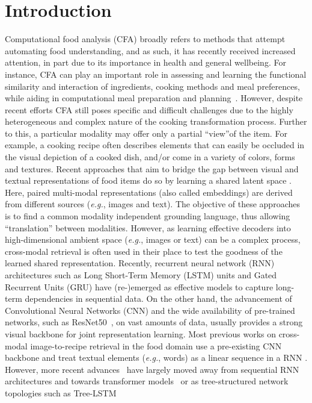 \documentclass[sigconf,nonacm]{acmart}
\def\eg{\emph{e.g.}} \def\Eg{\emph{E.g.}}
\begin{document}
\maketitle


\section{Introduction}
Computational food analysis (CFA) broadly refers to methods that attempt automating food understanding, and as such, it has recently received increased attention, in part due to its importance in health and general wellbeing. For instance, CFA  can play an important role in assessing and learning the functional similarity and interaction of ingredients, cooking methods and meal preferences, while aiding in computational meal preparation and planning~\cite{teng2012recipe,helmy2015health}. However, despite recent efforts CFA still poses specific and difficult challenges due to the highly heterogeneous and complex nature of the cooking transformation process. Further to this, a particular modality may offer only a partial ``view''of the item. For example, a cooking recipe often describes elements that can easily be occluded in the visual depiction of a cooked dish, and/or come in a variety of colors, forms and textures. Recent approaches that aim to bridge the gap between visual and textual representations of food items do so by learning a shared latent space \cite{salvador2017,chen2018,carvalho2018,wang2019,marin2019,Fu2020,Fain2019,Zhu2019,salvador2021,wang2020}. Here, paired multi-modal representations (also called embeddings) are derived from different sources (\eg, images and text). The objective of these approaches is to find a common modality independent grounding language, thus allowing ``translation'' between modalities. However, as learning effective decoders into high-dimensional ambient space (\eg, images or text) can be a complex process, cross-modal retrieval is often used in their place to test the goodness of the learned shared representation. Recently, recurrent neural network (RNN) architectures such as Long Short-Term Memory (LSTM) \cite{hochreiter1997} units and Gated Recurrent Units (GRU) \cite{cho2014} have (re-)emerged as effective models to capture long-term dependencies in sequential data. On the other hand, the advancement of Convolutional Neural Networks (CNN) and the wide availability of pre-trained networks, such as ResNet50~\cite{he2016}, on vast amounts of data, usually provides a strong visual backbone for joint representation learning. Most previous works on cross-modal image-to-recipe retrieval in the food domain use a pre-existing CNN backbone and treat textual elements (\eg, words) as a linear sequence in a RNN \cite{salvador2017,chen2018,carvalho2018,wang2019,Fu2020,Zhu2019, wang2020}. However, more recent advances~\cite{chef2021,salvador2021} have largely moved away from sequential RNN architectures and towards transformer models~\cite{Vaswani2017,Devlin2018} or as tree-structured network topologies such as Tree-LSTM~\cite{tai2015,zhu2015,choi2017}
\end{document}
